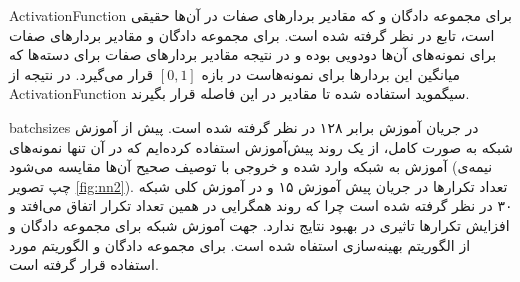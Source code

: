  \gls{ActivationFunction} برای مجموعه دادگان   و  که مقادیر بردارهای صفات در آن‌ها حقیقی است، تابع  در نظر گرفته شده است. برای مجموعه دادگان  و   مقادیر بردارهای صفات برای نمونه‌های آن‌ها دودویی بوده و در نتیجه مقادیر بردارهای صفات برای دسته‌ها که میانگین این بردارها برای نمونه‌هاست در بازه
$[0,1]$
قرار می‌گیرد. در نتیجه از \gls{ActivationFunction} سیگموید استفاده شده تا مقادیر در این فاصله قرار بگیرند.

 \glspl{batchsize} در جریان آموزش برابر ۱۲۸ در نظر گرفته شده است.
پیش از آموزش شبکه به صورت کامل، از یک روند پیش‌آموزش استفاده کرده‌ایم که در آن تنها نمونه‌های آموزش به شبکه وارد شده و خروجی با توصیف صحیح آن‌ها مقایسه می‌شود (نیمه‌ی چپ تصویر
\ref{fig:nn2}).
تعداد تکرارها در جریان پیش آموزش ۱۵ و در آموزش کلی شبکه ۳۰ در نظر گرفته شده است چرا که روند همگرایی در همین تعداد تکرار اتفاق می‌افتد و افزایش تکرارها تاثیری در بهبود نتایج ندارد.
جهت آموزش شبکه برای مجموعه دادگان  و  از الگوریتم بهینه‌سازی 
\cite{adam}
استفاه شده است. برای مجموعه دادگان  و  الگوریتم
 \cite{adadelta}
مورد استفاده قرار گرفته است.
